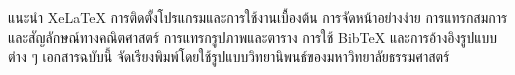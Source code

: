 
แนะนํา XeLaTeX การติดตั้งโปรแกรมและการใช้งานเบื้องต้น การจัดหน้าอย่างง่าย การแทรกสมการและสัญลักษณ์ทางคณิตศาสตร์ การแทรกรูปภาพและตาราง การใช้ BibTeX และการ\mbox{อ้างอิง}รูปแบบต่าง ๆ เอกสารฉบับนี้ จัดเรียงพิมพ์โดยใช้รูปแบบวิทยานิพนธ์ของมหาวิทยาลัยธรรมศาสตร์

